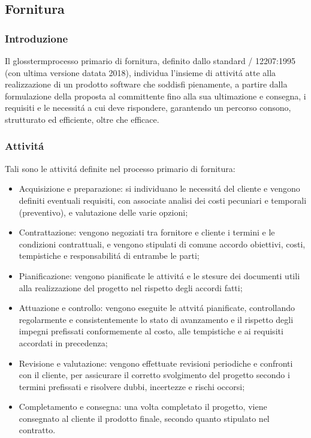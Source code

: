 
\subsection{Fornitura}

\subsubsection{Introduzione}
Il glossterm{processo} primario di fornitura, definito dallo standard / 12207:1995 (con ultima versione datata 2018), individua l'insieme di attivitá atte alla realizzazione di un prodotto software che soddisfi pienamente, a partire dalla formulazione della proposta al committente fino alla sua ultimazione e consegna, i requisiti e le necessitá a cui deve rispondere, garantendo un percorso consono, strutturato ed efficiente, oltre che efficace.

\subsubsection{Attivitá}
Tali sono le attivitá definite nel processo primario di fornitura:

\begin{itemize}
    \item Acquisizione e preparazione: si individuano le necessitá del cliente e vengono definiti eventuali requisiti, con associate analisi dei costi pecuniari e temporali (preventivo), e valutazione delle varie opzioni;
    \item Contrattazione: vengono negoziati tra fornitore e cliente i termini e le condizioni contrattuali, e vengono stipulati di comune accordo obiettivi, costi, tempistiche e responsabilitá di entrambe le parti;
    \item Pianificazione: vengono pianificate le attivitá e le stesure dei documenti utili alla realizzazione del progetto nel rispetto degli accordi fatti;
    \item Attuazione e controllo: vengono eseguite le attvitá pianificate, controllando regolarmente e consistentemente lo stato di avanzamento e il rispetto degli impegni prefissati conformemente al costo, alle tempistiche e ai requisiti accordati in precedenza;
    \item Revisione e valutazione: vengono effettuate revisioni periodiche e confronti con il cliente, per assicurare il corretto svolgimento del progetto secondo i termini prefissati e risolvere dubbi, incertezze e rischi occorsi;
    \item Completamento e consegna: una volta completato il progetto, viene consegnato al cliente il prodotto finale, secondo quanto stipulato nel contratto.
\end{itemize}

